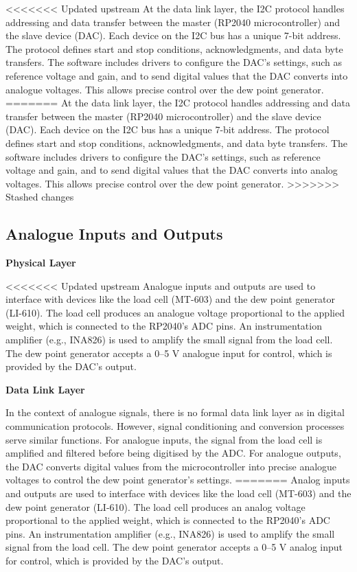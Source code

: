 <<<<<<< Updated upstream
At the data link layer, the I2C protocol handles addressing and data transfer between the master (RP2040 microcontroller) and the slave device (DAC). Each device on the I2C bus has a unique 7-bit address. The protocol defines start and stop conditions, acknowledgments, and data byte transfers. The software includes drivers to configure the DAC's settings, such as reference voltage and gain, and to send digital values that the DAC converts into analogue voltages. This allows precise control over the dew point generator.
=======
At the data link layer, the I2C protocol handles addressing and data transfer between the master 
(RP2040 microcontroller) and the slave device (DAC). Each device on the I2C bus has a unique 7-bit address. 
The protocol defines start and stop conditions, acknowledgments, and data byte transfers. The software includes drivers to configure the DAC's settings, such as reference voltage and gain, and to send digital values that the DAC converts into analog voltages. This allows precise control over the dew point generator.
>>>>>>> Stashed changes

\subsection{Analogue Inputs and Outputs}
\textbf{Physical Layer}

<<<<<<< Updated upstream
Analogue inputs and outputs are used to interface with devices like the load cell (MT-603) and the dew point generator (LI-610). The load cell produces an analogue voltage proportional to the applied weight, which is connected to the RP2040's ADC pins. An instrumentation amplifier (e.g., INA826) is used to amplify the small signal from the load cell. The dew point generator accepts a 0–5 V analogue input for control, which is provided by the DAC's output.

\textbf{Data Link Layer}

In the context of analogue signals, there is no formal data link layer as in digital communication protocols. However, signal conditioning and conversion processes serve similar functions. For analogue inputs, the signal from the load cell is amplified and filtered before being digitised by the ADC. For analogue outputs, the DAC converts digital values from the microcontroller into precise analogue voltages to control the dew point generator's settings.
=======
Analog inputs and outputs are used to interface with devices like the load cell (MT-603) and the dew point 
generator (LI-610). The load cell produces an analog voltage proportional to the applied weight, which is 
connected to the RP2040's ADC pins. An instrumentation amplifier (e.g., INA826) is used to amplify the small 
signal from the load cell. The dew point generator accepts a 0–5 V analog input for control, which is 
provided by the DAC's output.


